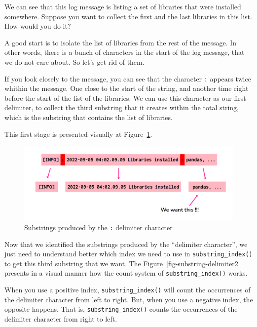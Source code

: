 \documentclass[
  11pt,
  letterpaper,
  DIV=11,
  numbers=noendperiod]{scrreprt}
\begin{document}
We can see that this log message is listing a set of libraries that were
installed somewhere. Suppose you want to collect the first and the last
libraries in this list. How would you do it?

A good start is to isolate the list of libraries from the rest of the
message. In other words, there is a bunch of characters in the start of
the log message, that we do not care about. So let's get rid of them.

If you look closely to the message, you can see that the character
\texttt{:} appears twice whithin the message. One close to the start of
the string, and another time right before the start of the list of the
libraries. We can use this character as our first delimiter, to collect
the third substring that it creates within the total string, which is
the substring that contains the list of libraries.

This first stage is presented visually at
Figure~\ref{fig-substring-delimiter1}.

\begin{figure}

{\centering \includegraphics{Chapters/./../Figures/substring-delimiter1.png}

}

\caption{\label{fig-substring-delimiter1}Substrings produced by the
\texttt{:} delimiter character}

\end{figure}

Now that we identified the substrings produced by the ``delimiter
character'', we just need to understand better which index we need to
use in \texttt{substring\_index()} to get this third substring that we
want. The Figure~\ref{fig-substring-delimiter2} presents in a visual
manner how the count system of \texttt{substring\_index()} works.

When you use a positive index, \texttt{substring\_index()} will count
the occurrences of the delimiter character from left to right. But, when
you use a negative index, the opposite happens. That is,
\texttt{substring\_index()} counts the occurrences of the delimiter
character from right to left.
\end{document}
